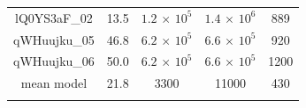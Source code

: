 \begin{appendix}
\begin{table}
\begin{threeparttable}
\begin{tabular}{ccccc}
lQ0YS3aF\_{02} &13.5&$1.2\,{\times}\,10^5$ &$1.4\,{\times}\,10^6$ & 889\\ 
qWHuujku\_{05} &46.8&$6.2\,{\times}\,10^5$ &$6.6\,{\times}\,10^5$ & 920\\ 
qWHuujku\_{06} &50.0 &$6.2\,{\times}\,10^5$ &$6.6\,{\times}\,10^5$ & 1200\\ 
\noalign{\smallskip}
\hline
mean model & 21.8 & 3300 & 11000 & 430\\
\noalign{\smallskip}
\hline
\end{tabular}
\end{threeparttable}
\end{table}

\end{appendix}



